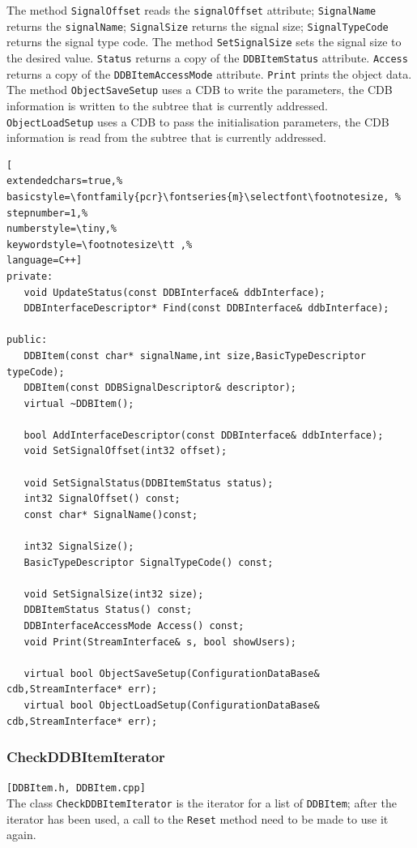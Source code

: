 The method \texttt{SignalOffset} reads the \texttt{signalOffset} attribute; \texttt{SignalName} returns the \texttt{signalName}; \texttt{SignalSize} returns the signal size; \texttt{SignalTypeCode} returns the signal type code. The method \texttt{SetSignalSize} sets the signal size to the desired value. \texttt{Status} returns a copy of the \texttt{DDBItemStatus} attribute. \texttt{Access} returns a copy of the \texttt{DDBItemAccessMode} attribute. \texttt{Print} prints the object data. \\

The method \texttt{ObjectSaveSetup} uses a CDB to write the parameters, the CDB information is written to the subtree that is currently addressed. \texttt{ObjectLoadSetup} uses a CDB to pass the initialisation parameters, the CDB information is read from the subtree that is currently addressed.

\begin{lstlisting}[
extendedchars=true,%
basicstyle=\fontfamily{pcr}\fontseries{m}\selectfont\footnotesize, %
stepnumber=1,%
numberstyle=\tiny,%
keywordstyle=\footnotesize\tt ,%
language=C++]
private:
   void UpdateStatus(const DDBInterface& ddbInterface);
   DDBInterfaceDescriptor* Find(const DDBInterface& ddbInterface);

public:
   DDBItem(const char* signalName,int size,BasicTypeDescriptor typeCode);
   DDBItem(const DDBSignalDescriptor& descriptor);
   virtual ~DDBItem();

   bool AddInterfaceDescriptor(const DDBInterface& ddbInterface);
   void SetSignalOffset(int32 offset);

   void SetSignalStatus(DDBItemStatus status);
   int32 SignalOffset() const;
   const char* SignalName()const;

   int32 SignalSize();
   BasicTypeDescriptor SignalTypeCode() const;

   void SetSignalSize(int32 size);
   DDBItemStatus Status() const;
   DDBInterfaceAccessMode Access() const;
   void Print(StreamInterface& s, bool showUsers);

   virtual bool ObjectSaveSetup(ConfigurationDataBase& cdb,StreamInterface* err);
   virtual bool ObjectLoadSetup(ConfigurationDataBase& cdb,StreamInterface* err);
\end{lstlisting}



\subsubsection{CheckDDBItemIterator}
\texttt{[DDBItem.h, DDBItem.cpp]}\\
The class \texttt{CheckDDBItemIterator} is the iterator for a list of \texttt{DDBItem}; after the iterator has been used, a call to the \texttt{Reset} method need to be made to use it again.

